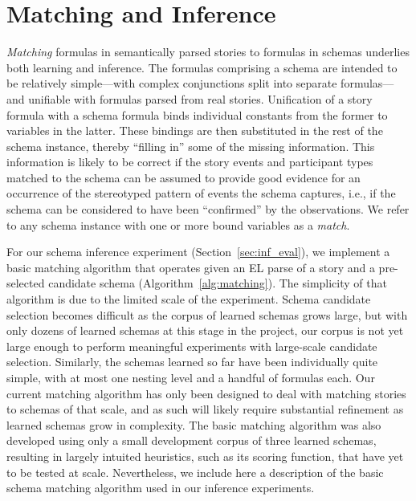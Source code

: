 \section{Matching and Inference}
\label{sec:match_inf}

\textit{Matching} formulas in semantically parsed stories to formulas in schemas underlies both learning and inference. The formulas comprising a schema are intended to be relatively simple---with complex conjunctions split into separate formulas---and unifiable with formulas parsed from real stories. Unification of a story formula with a schema formula binds individual constants from the former to variables in the latter. These bindings are then substituted in the rest of the schema instance, thereby ``filling in'' some of the missing information. %
This information is likely to be correct if the story events and participant types matched to the schema can be assumed to provide good evidence for an occurrence of the stereotyped pattern of events the schema captures, i.e., if the schema can be considered to have been ``confirmed'' by the observations.
We refer to any schema instance with one or more bound variables as a \textit{match}.

For our schema inference experiment (Section~\ref{sec:inf_eval}), we implement a basic matching algorithm that operates given an EL parse of a story and a pre-selected candidate schema (Algorithm~\ref{alg:matching}). The simplicity of that algorithm is due to the limited scale of the experiment. Schema candidate selection becomes difficult as the corpus of learned schemas grows large, but with only dozens of learned schemas at this stage in the project, our corpus is not yet large enough to perform meaningful experiments with large-scale candidate selection. Similarly, the schemas learned so far have been individually quite simple, with at most one nesting level and a handful of formulas each. Our current matching algorithm has only been designed to deal with matching stories to schemas of that scale, and as such will likely require substantial refinement as learned schemas grow in complexity. The basic matching algorithm was also developed using only a small development corpus of three learned schemas, resulting in largely intuited heuristics, such as its scoring function, that have yet to be tested at scale. Nevertheless, we include here a description of the basic schema matching algorithm used in our inference experiments.

